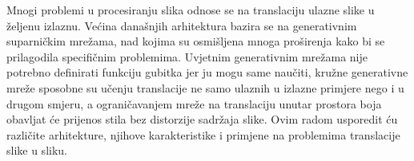 \documentclass[lmodern, utf8, seminar]{fer}
\begin{document}
\begin{sazetak}
Mnogi problemi u procesiranju slika odnose se na translaciju ulazne slike u željenu izlaznu. Većina današnjih arhitektura bazira se na generativnim suparničkim mrežama, nad kojima su osmišljena mnoga proširenja kako bi se prilagodila specifičnim problemima. Uvjetnim generativnim mrežama nije potrebno definirati funkciju gubitka jer ju mogu same naučiti, kružne generativne mreže sposobne su učenju translacije ne samo ulaznih u izlazne primjere nego i u drugom smjeru, a ograničavanjem mreže na translaciju unutar prostora boja obavljat će prijenos stila bez distorzije sadržaja slike. Ovim radom usporedit ću različite arhitekture, njihove karakteristike i primjene na problemima translacije slike u sliku.

\end{sazetak}

\begin{abstract}

\end{abstract}
\end{document}
